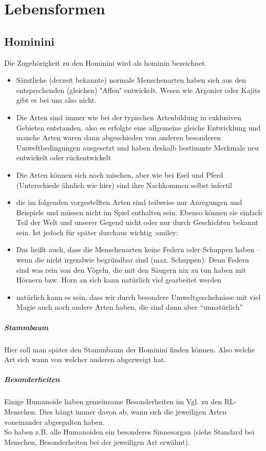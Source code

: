 \chapter{Lebensformen}
\section{Hominini}
Die Zugehörigkeit zu den Hominini wird als hominin bezeichnet.
\begin{itemize}
	\item Sämtliche (derzeit bekannte) normale Menschenarten haben sich aus den entsprechenden (gleichen) "Affen" entwickelt. Wesen wie Argonier oder Kajits gibt es bei uns also nicht.
	\item Die Arten sind immer wie bei der typischen Artenbildung in exklusiven Gebieten entstanden. also es erfolgte eine allgemeine gleiche Entwicklung und manche Arten waren dann abgeschieden von anderen besonderen Umweltbedingungen ausgesetzt und haben deshalb bestimmte Merkmale neu entwickelt oder rückentwickelt
	\item Die Arten können sich noch mischen, aber wie bei Esel und Pferd (Unterschiede ähnlich wie hier) sind ihre Nachkommen selbst infertil
	\item die im folgenden vorgestellten Arten sind teilweise nur Anregungen und Beispiele und müssen nicht im Spiel enthalten sein. Ebenso können sie einfach Teil der Welt und unserer Gegend nicht oder nur durch Geschichten bekannt sein. Ist jedoch für später durchaus wichtig :smiley:
	\item Das heißt auch, dass die Menschenarten keine Federn oder Schuppen haben -- wenn die nicht irgendwie begründbar sind (max. Schuppen). Denn Federn sind was rein von den Vögeln, die mit den Säugern nix zu tun haben
	mit Hörnern bzw. Horn an sich kann natürlich viel gearbeitet werden
	\item natürlich kann es sein, dass wir durch besondere Umweltgeschehnisse mit viel Magie auch noch andere Arten haben, die sind dann aber "`unnatürlich"'
\end{itemize}

\paragraph{Stammbaum} Hier soll man später den Stammbaum der Hominini finden können. Also welche Art sich wann von welcher anderen abgezweigt hat.

\paragraph{Besonderheiten}
Einige Humanoide haben gemeinsame Besonderheiten im Vgl. zu den RL-Menschen. Dies hängt immer davon ab, wann sich die jeweiligen Arten voneinander abgespalten haben. \\
So haben z.B. alle Humanoiden ein besonderes Sinnesorgan (siehe Standard bei Menschen, Besonderheiten bei der jeweiligen Art erwähnt).


